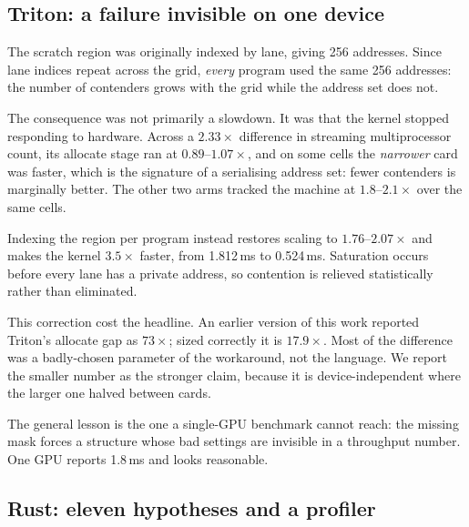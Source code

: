 \documentclass[11pt]{article}
\begin{document}
\subsection{Triton: a failure invisible on one device}

The scratch region was originally indexed by lane, giving 256 addresses. Since
lane indices repeat across the grid, \emph{every} program used the same 256
addresses: the number of contenders grows with the grid while the address set
does not.

The consequence was not primarily a slowdown. It was that the kernel stopped
responding to hardware. Across a $2.33\times$ difference in streaming
multiprocessor count, its allocate stage ran at $0.89$--$1.07\times$, and on some
cells the \emph{narrower} card was faster, which is the signature of a
serialising address set: fewer contenders is marginally better. The other two
arms tracked the machine at $1.8$--$2.1\times$ over the same cells.

Indexing the region per program instead restores scaling to
$1.76$--$2.07\times$ and makes the kernel $3.5\times$ faster, from 1.812\,ms to
0.524\,ms. Saturation occurs before every lane has a private address, so
contention is relieved statistically rather than eliminated.

This correction cost the headline. An earlier version of this work reported
Triton's allocate gap as $73\times$; sized correctly it is $17.9\times$. Most of
the difference was a badly-chosen parameter of the workaround, not the language.
We report the smaller number as the stronger claim, because it is
device-independent where the larger one halved between cards.

The general lesson is the one a single-GPU benchmark cannot reach: the missing
mask forces a structure whose bad settings are invisible in a throughput number.
One GPU reports 1.8\,ms and looks reasonable.

\subsection{Rust: eleven hypotheses and a profiler}

\begin{table}[h]
\centering
\small

\caption{Allocate kernel counters, 320k points, RTX 5070 Ti. Above the rule are
counts of work: Rust does less on every one except static instruction count,
where it is within 2\%, and it was still slower. Below the rule are the counters
that show why. ``Rust, fixed'' is after the change described in this section; the
dash marks a figure not recorded for that build.}
\label{tab:counters}
\end{table}
\end{document}
